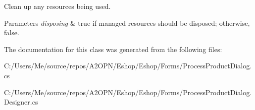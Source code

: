 Clean up any resources being used. 


\begin{DoxyParams}{Parameters}
{\em disposing} & true if managed resources should be disposed; otherwise, false.\\
\hline
\end{DoxyParams}


The documentation for this class was generated from the following files\+:\begin{DoxyCompactItemize}
\item 
C\+:/\+Users/\+Me/source/repos/\+A2\+O\+P\+N/\+Eshop/\+Eshop/\+Forms/Process\+Product\+Dialog.\+cs\item 
C\+:/\+Users/\+Me/source/repos/\+A2\+O\+P\+N/\+Eshop/\+Eshop/\+Forms/Process\+Product\+Dialog.\+Designer.\+cs\end{DoxyCompactItemize}
